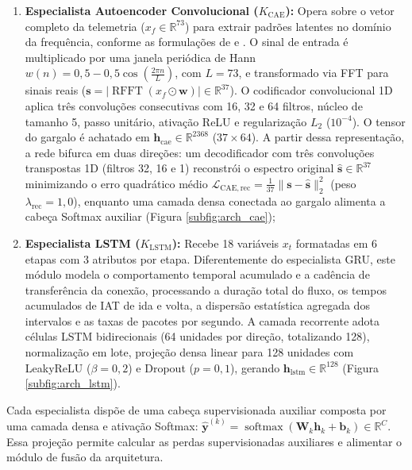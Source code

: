 \begin{enumerate}
    \item \textbf{Especialista Autoencoder Convolucional ($K_{\mathrm{CAE}}$):}
    Opera sobre o vetor completo da telemetria ($x_f \in \mathbb{R}^{73}$) para extrair padrões latentes no domínio da
    frequência, conforme as formulações de  e . O sinal de entrada é
    multiplicado por uma janela periódica de Hann
    $w(n) = 0{,}5 - 0{,}5 \cos\left(\frac{2\pi n}{L}\right)$, com $L = 73$, e transformado via FFT para sinais reais
    ($\mathbf{s} = |\operatorname{RFFT}(x_f \odot \mathbf{w})| \in \mathbb{R}^{37}$). O codificador convolucional 1D
    aplica três convoluções consecutivas com 16, 32 e 64 filtros, núcleo de tamanho 5, passo unitário, ativação ReLU e
    regularização $L_2$ ($10^{-4}$). O tensor do gargalo é achatado em $\mathbf{h}_{\mathrm{cae}} \in \mathbb{R}^{2368}$
    ($37 \times 64$). A partir dessa representação, a rede bifurca em duas direções: um decodificador com três
    convoluções transpostas 1D (filtros 32, 16 e 1) reconstrói o espectro
    original $\hat{\mathbf{s}} \in \mathbb{R}^{37}$ minimizando o erro quadrático médio
    $\mathcal{L}_{\mathrm{CAE,rec}} = \frac{1}{37}\|\mathbf{s} - \hat{\mathbf{s}}\|^2_2$ (peso $\lambda_{\mathrm{rec}}
    = 1{,}0$), enquanto uma camada densa conectada ao gargalo alimenta a cabeça Softmax auxiliar
    (Figura \ref{subfig:arch_cae});

    \item \textbf{Especialista LSTM ($K_{\mathrm{LSTM}}$):}
    Recebe 18 variáveis $x_t$ formatadas em 6 etapas com 3 atributos por etapa. Diferentemente do especialista GRU,
    este módulo modela o comportamento temporal acumulado e a cadência de transferência da conexão, processando a
    duração total do fluxo, os tempos acumulados de IAT de ida e volta, a dispersão estatística agregada dos intervalos
    e as taxas de pacotes por segundo. A camada recorrente adota células LSTM bidirecionais (64 unidades por direção,
    totalizando 128), normalização em lote, projeção densa linear para 128 unidades com LeakyReLU ($\beta = 0{,}2$) e
    Dropout ($p = 0{,}1$), gerando $\mathbf{h}_{\mathrm{lstm}} \in \mathbb{R}^{128}$ (Figura \ref{subfig:arch_lstm}).
\end{enumerate}

Cada especialista dispõe de uma cabeça supervisionada auxiliar composta por uma camada densa e ativação Softmax:
$\hat{\mathbf{y}}^{(k)} = \operatorname{softmax}(\mathbf{W}_k \mathbf{h}_k + \mathbf{b}_k) \in \mathbb{R}^C$. Essa
projeção permite calcular as perdas supervisionadas auxiliares e alimentar o módulo de fusão da arquitetura.

